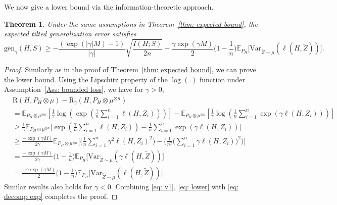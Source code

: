 \documentclass{article}
\theoremstyle{plain}
\theoremstyle{plain}
\newtheorem{theorem}{Theorem}[section]
\theoremstyle{definition}
\theoremstyle{remark}
\newcommand{\var}{\mathrm{Var}}
\newcommand{\RTrue}{\mathrm{R}}
\newcommand{\RTT}{\overline{\mathrm{R}}_{\gamma}}
\newcommand{\mbE}{\mathbb{E}}
\newcommand{\nn}{\nonumber}
\begin{document}
We now give a lower bound via the information-theoretic approach. 
\begin{tcolorbox}
    \begin{theorem}\label{thm: info lower}
    Under the same assumptions in Theorem~\ref{thm: expected bound}, the expected tilted generalization error satisfies
 \begin{equation*}
      \overline{\mathrm{gen}}_{\gamma}(H,S)\geq -\frac{(\exp(|\gamma| M)-1)}{|\gamma|}\sqrt{\frac{ I(H;S)}{2n}}-\frac{\gamma\exp(\gamma M)}{2} \big(1-\frac{1}{n}\big)\mathbb{E}_{P_H}\big[\var_{\tilde Z\sim\mu}(\ell(H,\tilde Z))\big] .
    \end{equation*}   
\end{theorem}
\end{tcolorbox}
\begin{proof}
    Similarly as in the proof of Theorem~\ref{thm: expected bound}, we can prove the lower bound. 
     Using the Lipschitz property of the $\log(.)$ function under Assumption~\ref{Ass: bounded loss}, we have for $\gamma>0$,
  \begin{equation}\label{eq: lower}
  \begin{split}
     &\RTrue(H, P_{H}\otimes \mu) -\RTT(H,P_{H}\otimes \mu^{\otimes n})\\
     &=\mbE_{P_{H}\otimes \mu^{\otimes n}}[\frac{1}{\gamma}\log(\exp(\frac{\gamma}{n}\sum_{i=1}^n \ell(H,Z_i)))]-\mbE_{P_{H}\otimes \mu^{\otimes n}}[\frac{1}{\gamma}\log(\frac{1}{n}\sum_{i=1}^n\exp(\gamma\ell(H,Z_i)))]\\
     &\geq \frac{1}{\gamma}\mbE_{P_{H}\otimes \mu^{\otimes n}}\Big[\exp(\frac{\gamma}{n}\sum_{i=1}^n \ell(H,Z_i))-\frac{1}{n}\sum_{i=1}^n\exp(\gamma\ell(H,Z_i))\Big]\\
     &\geq \frac{-\exp(\gamma M)}{2\gamma} \mbE_{P_{H}\otimes \mu^{\otimes n}}\Bigg[\Big(\frac{1}{n}\sum_{i=1}^n \gamma^2\ell(H,Z_i)^2\Big)-\Big(\frac{1}{n^2}\big(\sum_{i=1}^n \gamma\ell(H,Z_i)\big)^2 \Big)\Bigg ]\\
     &=\frac{-\exp(\gamma M)}{2\gamma } \big(1-\frac{1}{n}\big)\mathbb{E}_{P_H}\big[\var_{\tilde Z\sim\mu}(\gamma\ell(H,\tilde Z))\big]\\
     &=\frac{-\gamma\exp(\gamma M)}{2 } \big(1-\frac{1}{n}\big)\mathbb{E}_{P_H}\big[\var_{\tilde Z\sim\mu}(\ell(H,\tilde Z))\big].
  \end{split}
  \end{equation}
 Similar results also holds for $\gamma<0$. Combining \eqref{eq: v1}, \eqref{eq: lower}  with \eqref{eq: decomp exp} completes the proof. 
\end{proof}
\end{document}
